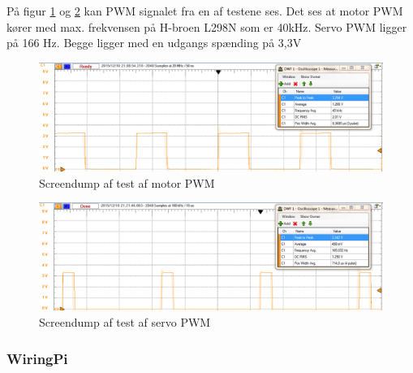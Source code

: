 

\clearpage
På figur \ref{fig:steering_pwm_motor_test} og \ref{fig:steering_pwm_servo_test} kan PWM signalet fra en af testene ses. Det ses at motor PWM kører med max. frekvensen på H-broen L298N som er 40kHz. Servo PWM ligger på 166 Hz. Begge ligger med en udgangs spænding på 3,3V
\begin{figure}[h]
	\centering
	\includegraphics[width=\textwidth* 9/10]{../fig/billeder/steering_pwm_motor_test}
	\caption{Screendump af test af motor PWM}
	\label{fig:steering_pwm_motor_test}
\end{figure}

\begin{figure}[h]
	\centering
	\includegraphics[width=\textwidth* 9/10]{../fig/billeder/steering_pwm_servo_test}
	\caption{Screendump af test af servo PWM}
	\label{fig:steering_pwm_servo_test}
\end{figure}

\clearpage
\subsubsection*{WiringPi} \label{sec:wiringPi_impl}